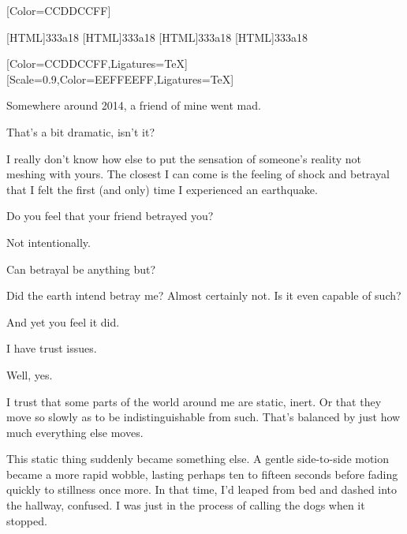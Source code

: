 \label{from-within}
\renewfontfamily{}[Color=CCDDCCFF]

[HTML]{333a18}
[HTML]{333a18}
[HTML]{333a18}
[HTML]{333a18}

\begin{paracol}{2}
\begin{leftcolumn}
  [Color=CCDDCCFF,Ligatures=TeX]
  \renewfontfamily{}[Scale=0.9,Color=EEFFEEFF,Ligatures=TeX]

\noindent Somewhere around 2014, a friend of mine went mad.

\begin{ally}
That's a bit dramatic, isn't it?
\end{ally}
I really don't know how else to put the sensation of someone's reality not meshing with yours. The closest I can come is the feeling of shock and betrayal that I felt the first (and only) time I experienced an earthquake.

\begin{ally}
Do you feel that your friend betrayed you?
\end{ally}
Not intentionally.

\begin{ally}
Can betrayal be anything but?
\end{ally}
Did the earth intend betray me? Almost certainly not. Is it even capable of such?

\begin{ally}
And yet you feel it did.
\end{ally}
I have trust issues.

\begin{ally}
Well, yes.
\end{ally}
I trust that some parts of the world around me are static, inert. Or that they move so slowly as to be indistinguishable from such. That's balanced by just how much everything else moves.

This static thing suddenly became something else. A gentle side-to-side motion became a more rapid wobble, lasting perhaps ten to fifteen seconds before fading quickly to stillness once more. In that time, I'd leaped from bed and dashed into the hallway, confused. I was just in the process of calling the dogs when it stopped.


\end{leftcolumn}
\end{paracol}
